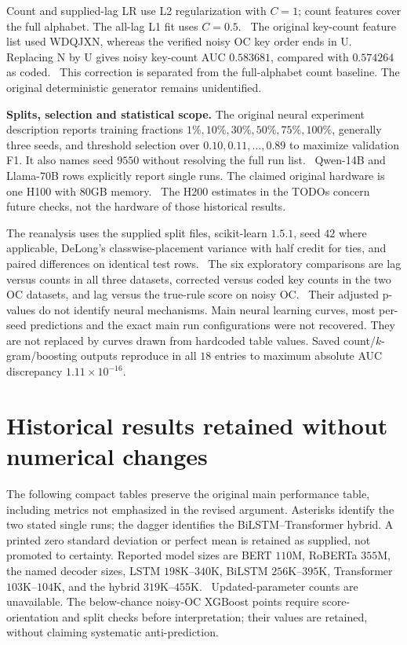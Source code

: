 Count and supplied-lag LR use L2 regularization with $C=1$; count features cover the full alphabet. The all-lag L1 fit uses $C=0.5$. \newres\ The original key-count feature list used WDQJXN, whereas the verified noisy OC key order ends in U. Replacing N by U gives noisy key-count AUC $0.583681$, compared with $0.574264$ as coded. \newres\ This correction is separated from the full-alphabet count baseline. The original deterministic generator remains unidentified.

\textbf{Splits, selection and statistical scope.} The original neural experiment description reports training fractions $1\%,10\%,30\%,50\%,75\%,100\%$, generally three seeds, and threshold selection over $0.10,0.11,\ldots,0.89$ to maximize validation F1. It also names seed $9550$ without resolving the full run list. \ou\ Qwen-14B and Llama-70B rows explicitly report single runs. The claimed original hardware is one H100 with $80$GB memory. \ou\ The H200 estimates in the TODOs concern future checks, not the hardware of those historical results.

The reanalysis uses the supplied split files, scikit-learn $1.5.1$, seed $42$ where applicable, DeLong's classwise-placement variance with half credit for ties, and paired differences on identical test rows. \newres\ The six exploratory comparisons are lag versus counts in all three datasets, corrected versus coded key counts in the two OC datasets, and lag versus the true-rule score on noisy OC. \newres\ Their adjusted p-values do not identify neural mechanisms. Main neural learning curves, most per-seed predictions and the exact main run configurations were not recovered. They are not replaced by curves drawn from hardcoded table values. Saved count/$k$-gram/boosting outputs reproduce in all $18$ entries to maximum absolute AUC discrepancy $1.11\times10^{-16}$. \recomp

\section{Historical results retained without numerical changes}
\label{app:historical}
The following compact tables preserve the original main performance table, including metrics not emphasized in the revised argument. Asterisks identify the two stated single runs; the dagger identifies the BiLSTM--Transformer hybrid. A printed zero standard deviation or perfect mean is retained as supplied, not promoted to certainty. Reported model sizes are BERT $110$M, RoBERTa $355$M, the named decoder sizes, LSTM $198$K--$340$K, BiLSTM $256$K--$395$K, Transformer $103$K--$104$K, and the hybrid $319$K--$455$K. \ou\ Updated-parameter counts are unavailable. The below-chance noisy-OC XGBoost points require score-orientation and split checks before interpretation; their values are retained, without claiming systematic anti-prediction.

